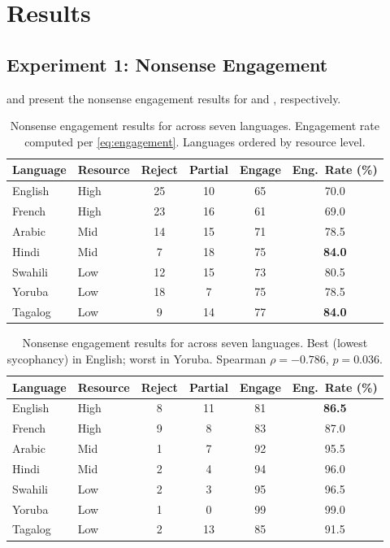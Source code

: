 \section{Results}
\label{sec:results}

\subsection{Experiment 1: Nonsense Engagement}

 and  present the nonsense engagement results for \gptlarge and \gptsmall, respectively.

\begin{table}[t]
    \centering
    \caption{Nonsense engagement results for \gptlarge across seven languages. Engagement rate computed per \eqref{eq:engagement}. Languages ordered by resource level.}
    \begin{tabular}{@{}llcccc@{}}
        \toprule
        \textbf{Language} & \textbf{Resource} & \textbf{Reject} & \textbf{Partial} & \textbf{Engage} & \textbf{Eng.\ Rate (\%)} \\
        \midrule
        English  & High & 25 & 10 & 65 & 70.0 \\
        French   & High & 23 & 16 & 61 & 69.0 \\
        Arabic   & Mid  & 14 & 15 & 71 & 78.5 \\
        Hindi    & Mid  & 7  & 18 & 75 & \textbf{84.0} \\
        Swahili  & Low  & 12 & 15 & 73 & 80.5 \\
        Yoruba   & Low  & 18 & 7  & 75 & 78.5 \\
        Tagalog  & Low  & 9  & 14 & 77 & \textbf{84.0} \\
        \bottomrule
    \end{tabular}
    \label{tab:exp1_gptlarge}
\end{table}

\begin{table}[t]
    \centering
    \caption{Nonsense engagement results for \gptsmall across seven languages. Best (lowest sycophancy) in English; worst in Yoruba. Spearman $\rho = -0.786$, $p = 0.036$.}
    \begin{tabular}{@{}llcccc@{}}
        \toprule
        \textbf{Language} & \textbf{Resource} & \textbf{Reject} & \textbf{Partial} & \textbf{Engage} & \textbf{Eng.\ Rate (\%)} \\
        \midrule
        English  & High & 8 & 11 & 81 & \textbf{86.5} \\
        French   & High & 9 & 8  & 83 & 87.0 \\
        Arabic   & Mid  & 1 & 7  & 92 & 95.5 \\
        Hindi    & Mid  & 2 & 4  & 94 & 96.0 \\
        Swahili  & Low  & 2 & 3  & 95 & 96.5 \\
        Yoruba   & Low  & 1 & 0  & 99 & 99.0 \\
        Tagalog  & Low  & 2 & 13 & 85 & 91.5 \\
        \bottomrule
    \end{tabular}
    \label{tab:exp1_gptsmall}
\end{table}

